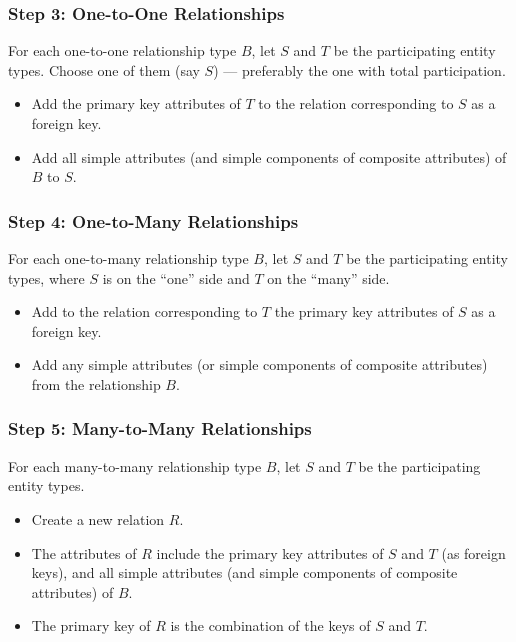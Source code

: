 \subsubsection{Step 3: One-to-One Relationships}
For each one-to-one relationship type \(B\), let \(S\) and \(T\) be the participating entity types. Choose one of them (say \(S\)) — preferably the one with total participation.  
\begin{itemize}
  \item Add the primary key attributes of \(T\) to the relation corresponding to \(S\) as a foreign key.  
  \item Add all simple attributes (and simple components of composite attributes) of \(B\) to \(S\).  
\end{itemize}

\subsubsection{Step 4: One-to-Many Relationships}
For each one-to-many relationship type \(B\), let \(S\) and \(T\) be the participating entity types, where \(S\) is on the “one” side and \(T\) on the “many” side.  
\begin{itemize}
  \item Add to the relation corresponding to \(T\) the primary key attributes of \(S\) as a foreign key.  
  \item Add any simple attributes (or simple components of composite attributes) from the relationship \(B\).  
\end{itemize}

\subsubsection{Step 5: Many-to-Many Relationships}
For each many-to-many relationship type \(B\), let \(S\) and \(T\) be the participating entity types.  
\begin{itemize}
  \item Create a new relation \(R\).  
  \item The attributes of \(R\) include the primary key attributes of \(S\) and \(T\) (as foreign keys), and all simple attributes (and simple components of composite attributes) of \(B\).  
  \item The primary key of \(R\) is the combination of the keys of \(S\) and \(T\).  
\end{itemize}

